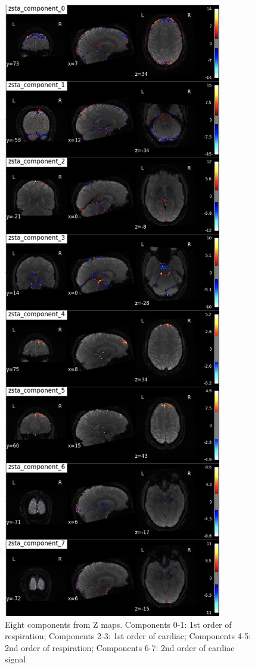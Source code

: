 \begin{figure}[htp]
  \centering
  \includegraphics[width=0.8\columnwidth]{Figures/z-map.jpeg}
  \caption{Eight components from Z maps. Components 0-1: 1st order of respiration; Components 2-3: 1st order of cardiac;
  Components 4-5: 2nd order of respiration; Components 6-7: 2nd order of cardiac signal}
  \label{fig:zmap}
\end{figure} 

